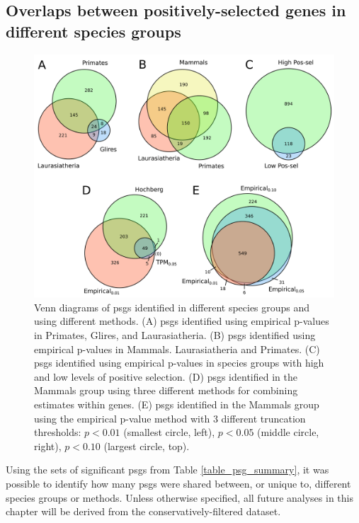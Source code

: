\subsection{Overlaps between positively-selected genes in different species groups}

\begin{figure}
\centering
\includegraphics[scale=0.3]{Figs/psg_venns.pdf}
\caption{Venn diagrams of \acp{psg} identified in different species
  groups and using different methods. (A) \acp{psg} identified using
  empirical p-values in Primates, Glires, and Laurasiatheria. (B)
  \acp{psg} identified using empirical p-values in
  Mammals. Laurasiatheria and Primates. (C) \acp{psg} identified using
  empirical p-values in species groups with high and low levels of
  positive selection. (D) \acp{psg} identified in the Mammals group
  using three different methods for combining \sw estimates within
  genes. (E) \acp{psg} identified in the Mammals group using the
  empirical p-value method with 3 different truncation thresholds:
  $p<0.01$ (smallest circle, left), $p<0.05$ (middle circle, right),
  $p<0.10$ (largest circle, top).}
\label{fig_psg_venns}
\end{figure}

Using the sets of significant \acp{psg} from Table
\ref{table_psg_summary}, it was possible to identify how many
\acp{psg} were shared between, or unique to, different species groups
or methods. Unless otherwise specified, all future analyses in this
chapter will be derived from the conservatively-filtered dataset.

